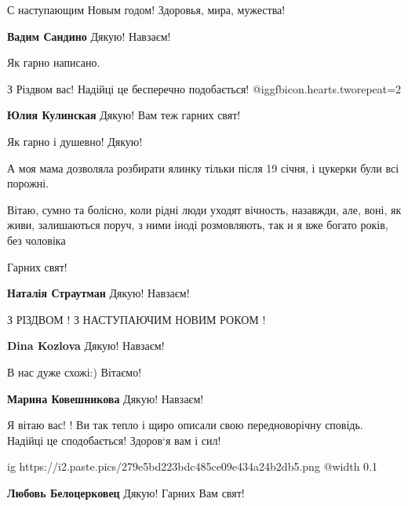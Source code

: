  
 
 
 
 
\zzSecCmt

\begin{itemize} %
С наступающим Новым годом! Здоровья, мира, мужества!

\textbf{Вадим Сандино} Дякую! Навзаєм!

Як гарно написано.

З Різдвом вас! Надійці це бесперечно подобається!  @igg{fbicon.hearts.two}{repeat=2} 

\textbf{Юлия Кулинская} Дякую! Вам теж гарних свят!

Як гарно і душевно! Дякую!

А моя мама дозволяла розбирати ялинку тільки після 19 січня, і цукерки були всі порожні.


Вітаю, сумно та болісно, коли рідні люди уходят вічность, назавжди, але, воні, як
живи, залишаються поруч, з ними іноді розмовляють, так и я вже богато років, без
чоловіка

Гарних свят!

\textbf{Наталія Страутман} Дякую! Навзаєм!

З РІЗДВОМ !
З НАСТУПАЮЧИМ НОВИМ РОКОМ !

\textbf{Dina Kozlova} Дякую! Навзаєм!

В нас дуже схожі:) Вітаємо!

\textbf{Марина Ковешникова} Дякую! Навзаєм!

Я вітаю вас! !
Ви так тепло і щиро описали свою передноворічну сповідь. Надійці це сподобається!
Здоров‘я вам і сил!

\ifcmt
  ig https://i2.paste.pics/279e5bd223bdc485ce09e434a24b2db5.png
  @width 0.1
\fi

\textbf{Любовь Белоцерковец} Дякую! Гарних Вам свят!


\end{itemize}
